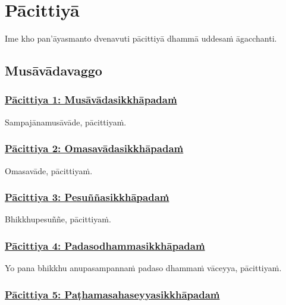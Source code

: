 
\section{Pācittiyā}
\label{pc}

\begin{intro}
	Ime kho pan'āyasmanto dvenavuti pācittiyā dhammā uddesaṁ āgacchanti.
\end{intro}

\subsection{Musāvādavaggo}

\subsubsection*{\hyperref[exp1]{Pācittiya 1: Musāvādasikkhāpadaṁ}}
\label{pac1}

Sampajānamusāvāde, pācittiyaṁ.



\subsubsection*{\hyperref[exp2]{Pācittiya 2: Omasavādasikkhāpadaṁ}}
\label{pac2}

Omasavāde, pācittiyaṁ.



\subsubsection*{\hyperref[exp3]{Pācittiya 3: Pesuññasikkhāpadaṁ}}
\label{pac3}

Bhikkhupesuññe, pācittiyaṁ.



\subsubsection*{\hyperref[exp4]{Pācittiya 4: Padasodhammasikkhāpadaṁ}}
\label{pac4}

Yo pana bhikkhu anupasampannaṁ padaso dhammaṁ vāceyya, pācittiyaṁ.



\subsubsection*{\hyperref[exp5]{Pācittiya 5: Paṭhamasahaseyyasikkhāpadaṁ}}
\label{pac5}

